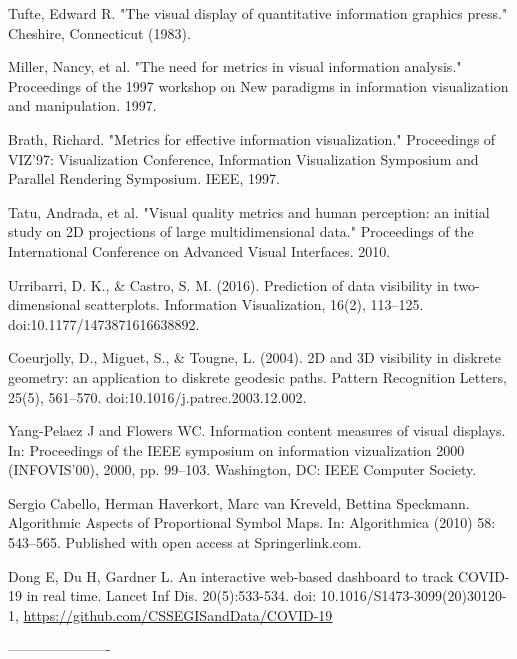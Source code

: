 \documentclass[a4paper,11pt]{article}
\begin{document}
\newpage
\begin{thebibliography}{999}

  Tufte, Edward R. "The visual display of quantitative information graphics press." Cheshire, Connecticut (1983).

  Miller, Nancy, et al. "The need for metrics in visual information analysis." Proceedings of the 1997 workshop on New paradigms in information visualization and manipulation. 1997.

  Brath, Richard. "Metrics for effective information visualization." Proceedings of VIZ'97: Visualization Conference, Information Visualization Symposium and Parallel Rendering Symposium. IEEE, 1997.

  Tatu, Andrada, et al. "Visual quality metrics and human perception: an initial study on 2D projections of large multidimensional data." Proceedings of the International Conference on Advanced Visual Interfaces. 2010.

  Urribarri, D. K., \& Castro, S. M. (2016). Prediction of data visibility in two-dimensional scatterplots. Information Visualization, 16(2), 113–125. doi:10.1177/1473871616638892.

  Coeurjolly, D., Miguet, S., \& Tougne, L. (2004). 2D and 3D visibility in diskrete geometry: an application to diskrete geodesic paths. Pattern Recognition Letters, 25(5), 561–570. doi:10.1016/j.patrec.2003.12.002.

  Yang-Pelaez J and Flowers WC. Information content
  measures of visual displays. In: Proceedings of the IEEE symposium on information vizualization 2000 (INFOVIS’00), 2000, pp. 99–103. Washington, DC: IEEE Computer Society.

  Sergio Cabello, Herman Haverkort, Marc van Kreveld, Bettina Speckmann. Algorithmic Aspects of Proportional Symbol Maps. In: Algorithmica (2010) 58: 543–565. Published with open access at Springerlink.com.%

   Dong E, Du H, Gardner L. An interactive web-based dashboard to track COVID-19 in real time. Lancet Inf Dis. 20(5):533-534. doi: 10.1016/S1473-3099(20)30120-1, \url{https://github.com/CSSEGISandData/COVID-19}



\end{thebibliography}

----------------------
\end{document}

